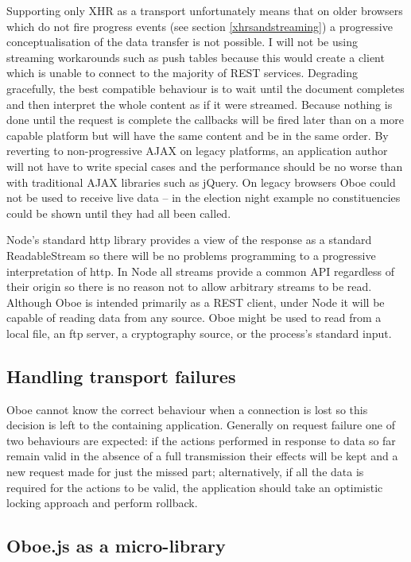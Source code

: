 \documentclass[12pt, ]{article}
\begin{document}
Supporting only XHR as a transport unfortunately means that on older
browsers which do not fire progress events (see section
\ref{xhrsandstreaming}) a progressive conceptualisation of the data
transfer is not possible. I will not be using streaming workarounds such
as push tables because this would create a client which is unable to
connect to the majority of REST services. Degrading gracefully, the best
compatible behaviour is to wait until the document completes and then
interpret the whole content as if it were streamed. Because nothing is
done until the request is complete the callbacks will be fired later
than on a more capable platform but will have the same content and be in
the same order. By reverting to non-progressive AJAX on legacy
platforms, an application author will not have to write special cases
and the performance should be no worse than with traditional AJAX
libraries such as jQuery. On legacy browsers Oboe could not be used to
receive live data -- in the election night example no constituencies
could be shown until they had all been called.

Node's standard http library provides a view of the response as a
standard ReadableStream so there will be no problems programming to a
progressive interpretation of http. In Node all streams provide a common
API regardless of their origin so there is no reason not to allow
arbitrary streams to be read. Although Oboe is intended primarily as a
REST client, under Node it will be capable of reading data from any
source. Oboe might be used to read from a local file, an ftp server, a
cryptography source, or the process's standard input.

\subsection{Handling transport
failures}\label{handling-transport-failures}

Oboe cannot know the correct behaviour when a connection is lost so this
decision is left to the containing application. Generally on request
failure one of two behaviours are expected: if the actions performed in
response to data so far remain valid in the absence of a full
transmission their effects will be kept and a new request made for just
the missed part; alternatively, if all the data is required for the
actions to be valid, the application should take an optimistic locking
approach and perform rollback.

\subsection{Oboe.js as a
micro-library}\label{oboe.js-as-a-micro-library}
\end{document}
